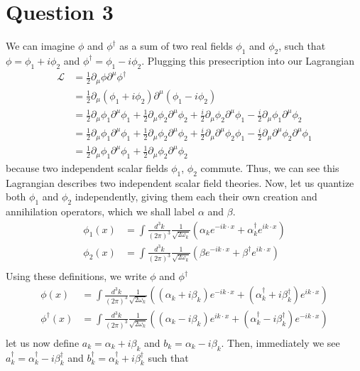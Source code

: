 \documentclass[12pt]{article}
\newcommand{\delmu}{\partial_{\mu}}
\newcommand{\delMu}{\partial^{\mu}}
\newcommand{\+}{\dagger}
\begin{document}
\section*{Question 3}
We can imagine $\phi$ and $\phi^{\dagger}$ as a sum of two real fields $\phi_1$ 
and $\phi_2$, such that $\phi = \phi_1 + i\phi_2$ and $\phi^{\dagger} = \phi_1 -
i\phi_2$. Plugging this presecription into our Lagrangian
\begin{align*}
   \mathcal{L} &= \frac{1}{2}\delmu\phi\delMu\phi^{\dagger} \\ 
               &= \frac{1}{2}\delmu(\phi_1 + i \phi_2)\delMu(\phi_1 - i\phi_2) \\
               &= \frac{1}{2}\delmu\phi_1\delMu\phi_1
               + \frac{1}{2}\delmu\phi_2\delMu\phi_2
               + \frac{i}{2}\delmu\phi_2\delMu\phi_1
               - \frac{i}{2}\delmu\phi_1\delMu\phi_2 \\
               &= \frac{1}{2}\delmu\phi_1\delMu\phi_1
               + \frac{1}{2}\delmu\phi_2\delMu\phi_2
               + \frac{i}{2}\delmu\delMu\phi_2\phi_1
               - \frac{i}{2}\delmu\delMu\phi_2\delMu\phi_1 \\
               &= \frac{1}{2}\delmu\phi_1\delMu\phi_1
               + \frac{1}{2}\delmu\phi_2\delMu\phi_2
\end{align*}
because two independent scalar fields $\phi_1$, $\phi_2$ commute. Thus, we can
see this Lagrangian describes two independent scalar field theories. Now,
let us quantize both $\phi_1$ and $\phi_2$ independently, giving them each
their own creation and annihilation operators, which we shall label $\alpha$ 
and $\beta$.
\begin{align*}
   \phi_1(x) &= \int \frac{d^3k}{(2\pi)^3} \frac{1}{\sqrt{2\omega_k}} (\alpha_k
   e^{-ik\cdot x} + \alpha_k^{\dagger}e^{ik\cdot x}) \\
   \phi_2(x) &= \int \frac{d^3k}{(2\pi)^3} \frac{1}{\sqrt{2\omega_k}} (\beta
   e^{-ik\cdot x} + \beta^{\dagger}e^{ik\cdot x}) \\
\end{align*}
Using these definitions, we write $\phi$ and $\phi^{\dagger}$
\begin{align*}
   \phi(x) &= \int \frac{d^3k}{(2\pi)^3} \frac{1}{\sqrt{2\omega_k}} \left(
   (\alpha_k + i\beta_k)e^{-ik\cdot x} + (\alpha^{\dagger}_k +
   i\beta^{\dagger}_k)e^{ik\cdot x} \right) \\
   \phi^{\dagger}(x) &= \int \frac{d^3k}{(2\pi)^3} \frac{1}{\sqrt{2\omega_k}}
   \left( (\alpha_k - i\beta_k)e^{ik\cdot x} + (\alpha^{\dagger}_k -
   i\beta^{\dagger}_k)e^{-ik\cdot x} \right) \\
\end{align*}
let us now define $a_k = \alpha_k + i\beta_k$ and $b_k = \alpha_k - i\beta_k$. Then,
immediately we see $a^{\dagger}_k = \alpha_k^{\dagger} - i\beta_k^{\dagger}$ and 
$b^{\dagger}_k = \alpha_k^{\dagger} + i \beta_k^{\dagger}$ such that
\end{document}
